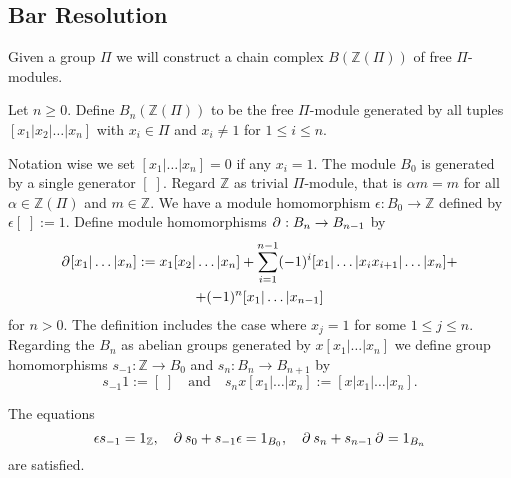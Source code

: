 \subsection{Bar Resolution}
\label{ss:barresolution}
Given a group $\Pi$ we will construct a chain complex $B(\mathbb{Z}(\Pi))$ of free $\Pi$-modules.
\begin{definition}
Let $n \geq 0$.
Define $B_n(\mathbb{Z}(\Pi))$ to be the free $\Pi$-module generated by all tuples $[x_1|x_2|\dots|x_n]$ with $x_i \in \Pi$ and $x_i \neq 1$ for $1\leq i \leq n$.
\end{definition}
Notation wise we set $[x_1|\dots|x_n]=0$ if any $x_i = 1$.
The module $B_0$ is generated by a single generator $[\;]$.
Regard $\mathbb{Z}$ as trivial $\Pi$-module, that is $\alpha m = m$ for all $\alpha \in \mathbb{Z}(\Pi)$ and $m\in \mathbb{Z}$.
We have a module homomorphism $\epsilon: B_0 \to \mathbb{Z}$ defined by $\epsilon [\;] := 1$.
Define module homomorphisms $\operatorname{\partial}_{}:B_n \to B_{n-1}$ by
\begin{multline*}
\operatorname{\partial}_{}[x_1|\dots|x_n] 
:= x_1[x_2|\dots|x_n]
+\sum_{i=1}^{n-1}(-1)^i [x_1|\dots|x_i x_{i+1}|\dots|x_n]+ \\ 
+(-1)^n [x_1|\dots|x_{n-1}]
\end{multline*}
for $n > 0$.
The definition includes the case where $x_j=1$ for some $1\leq j \leq n$.
Regarding the $B_n$ as abelian groups generated by $x[x_1|\dots|x_n]$ we define group homomorphisms $s_{-1}: \mathbb{Z} \to B_0$ and $s_n: B_n \to B_{n+1}$ by
\begin{equation*}
s_{-1} 1 := [\;]\quad \text{and} \quad s_n x[x_1|\dots|x_n] := [x|x_1|\dots|x_n].
\end{equation*}
\begin{lemma} %
\label{lemma:s_contracting_homotopy}
The equations
\begin{equation}
\label{eq:s_contracting_homotopy}
\epsilon s_{-1} = 1_\mathbb{Z}, \quad
\operatorname{\partial}_{} s_0 + s_{-1}\epsilon = 1_{B_0}, \quad
\operatorname{\partial}_{}s_n + s_{n-1}\operatorname{\partial}_{} = 1_{B_n}
\end{equation}
are satisfied.
\end{lemma}
